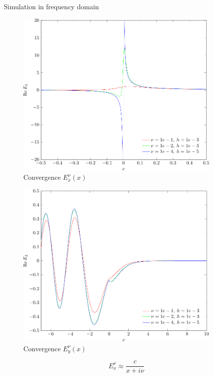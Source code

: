 \begin{frame}{Simulation in frequency domain}
 \begin{minipage}{0.45\linewidth}
\begin{figure}
	\begin{center}
       	\includegraphics[width = 0.9\textwidth]{./images/picture2}
       	\caption{Convergence $E_x^\nu(x)$}
    \end{center}
\end{figure} 
\end{minipage}
\hfill
\begin{minipage}{0.45\linewidth}
	\begin{figure}
\begin{center}
       	\includegraphics[width = 0.9\textwidth]{./images/pics3}
       	\caption{Convergence $E^\nu_y(x)$}
    \end{center}
\end{figure} 
\end{minipage}
\[
E_x^\nu \approx \frac{c}{x + i \nu}
\]

\end{frame}
